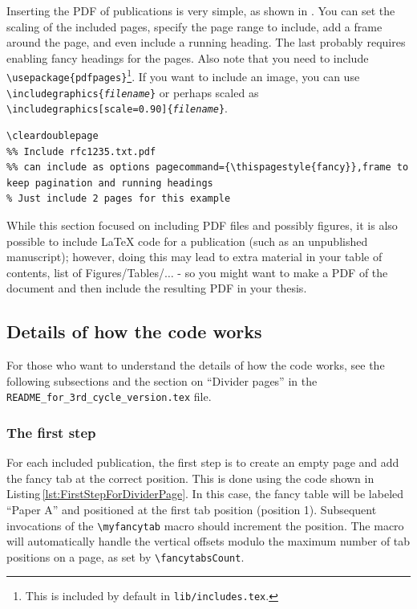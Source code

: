 \documentclass[12pt, twoside]{article}
\newcommand{\fname}[1]{\texttt{#1}}
\begin{document}
Inserting the \gls{PDF} of publications is very simple, as shown in . You can set the scaling of the included pages, specify the page range to include, add a frame around the page, and even include a running heading. The last probably requires enabling fancy headings for the pages. Also note that you need to include \texttt{\textbackslash usepackage\{pdfpages\}}\footnote{This is included by default in \fname{lib/includes.tex}.}. If you want to include an image, you can use \texttt{\textbackslash includegraphics\{\textit{filename}\}} or perhaps scaled as \texttt{\textbackslash includegraphics[scale=0.90]\{\textit{filename}\}}.
\begin{lstlisting}[style=latexExampleForAuthors, caption={Using \texttt{\textbackslash includepdf\{\}} to include the \gls{PDF} of a publication}, label=lst:InsertingPDFofIncludedPublication]
\cleardoublepage
%% Include rfc1235.txt.pdf
%% can include as options pagecommand={\thispagestyle{fancy}},frame to keep pagination and running headings
% Just include 2 pages for this example

\end{lstlisting}

While this section focused on including \gls{PDF} files and possibly figures, it is also possible to include \LaTeX{}  code for a publication (such as an unpublished manuscript); however, doing this may lead to extra material in your table of contents, list of Figures/Tables/$\ldots$ - so you might want to make a \gls{PDF} of the document and then include the resulting \gls{PDF} in your thesis.

\subsection{Details of how the code works}
\label{sec:cycle3DividercodeSteps}

For those who want to understand the details of how the code works, see the following subsections and the section on \enquote{Divider pages} in the \fname{README\_for\_3rd\_cycle\_version.tex} file.

\subsubsection{The first step}
For each included publication, the first step is to create an empty page and add the fancy tab at the correct position. This is done using the code shown in Listing\,\ref{lst:FirstStepForDividerPage}. In this case, the fancy table will be labeled \enquote{Paper A} and positioned at the first tab position (position 1). Subsequent invocations of the \texttt{\textbackslash myfancytab} macro should increment the position. The macro will automatically handle the vertical offsets modulo the maximum number of tab positions on a page, as set by \texttt{\textbackslash fancytabsCount}.
\end{document}
